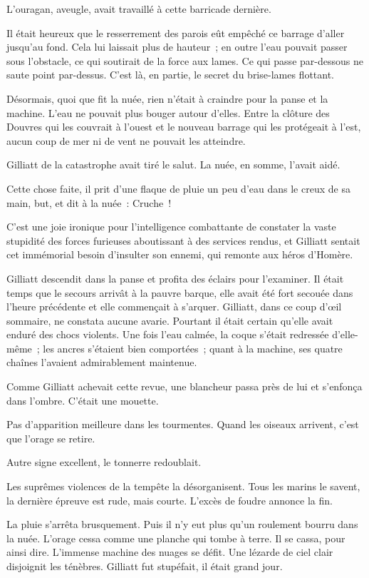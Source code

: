 \documentclass[french,twoside]{book} %
\begin{document}
L’ouragan, aveugle, avait travaillé à cette barricade dernière.\par
Il était heureux que le resserrement des parois eût  empêché ce barrage d’aller jusqu’au fond. Cela lui laissait plus de hauteur ; en outre l’eau pouvait passer sous l’obstacle, ce qui soutirait de la force aux lames. Ce qui passe par-dessous ne saute point par-dessus. C’est là, en partie, le secret du brise-lames flottant.\par
Désormais, quoi que fit la nuée, rien n’était à craindre pour la panse et la machine. L’eau ne pouvait plus bouger autour d’elles. Entre la clôture des Douvres qui les couvrait à l’ouest et le nouveau barrage qui les protégeait à l’est, aucun coup de mer ni de vent ne pouvait les atteindre.\par
Gilliatt de la catastrophe avait tiré le salut. La nuée, en somme, l’avait aidé.\par
Cette chose faite, il prit d’une flaque de pluie un peu d’eau dans le creux de sa main, but, et dit à la nuée : Cruche !\par
C’est une joie ironique pour l’intelligence combattante de constater la vaste stupidité des forces furieuses aboutissant à des services rendus, et Gilliatt sentait cet immémorial besoin d’insulter son ennemi, qui remonte aux héros d’Homère.\par
Gilliatt descendit dans la panse et profita des éclairs pour l’examiner. Il était temps que le secours arrivât à la pauvre barque, elle avait été fort secouée dans l’heure précédente et elle commençait à s’arquer. Gilliatt, dans ce coup d’œil sommaire, ne constata aucune avarie. Pourtant il était certain qu’elle avait enduré des chocs violents. Une fois l’eau calmée, la coque s’était redressée d’elle-même ; les ancres s’étaient bien  comportées ; quant à la machine, ses quatre chaînes l’avaient admirablement maintenue.\par
Comme Gilliatt achevait cette revue, une blancheur passa près de lui et s’enfonça dans l’ombre. C’était une mouette.\par
Pas d’apparition meilleure dans les tourmentes. Quand les oiseaux arrivent, c’est que l’orage se retire.\par
Autre signe excellent, le tonnerre redoublait.\par
Les suprêmes violences de la tempête la désorganisent. Tous les marins le savent, la dernière épreuve est rude, mais courte. L’excès de foudre annonce la fin.\par
La pluie s’arrêta brusquement. Puis il n’y eut plus qu’un roulement bourru dans la nuée. L’orage cessa comme une planche qui tombe à terre. Il se cassa, pour ainsi dire. L’immense machine des nuages se défit. Une lézarde de ciel clair disjoignit les ténèbres. Gilliatt fut stupéfait, il était grand jour.\par
\end{document}
